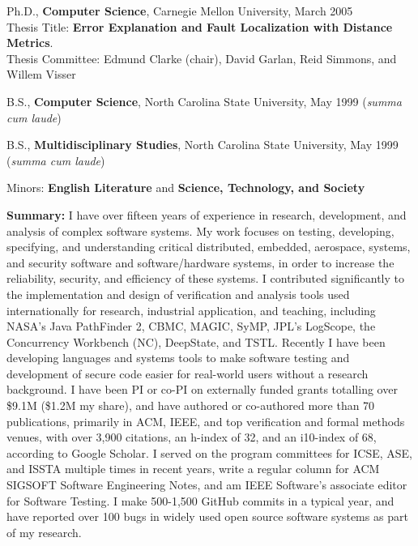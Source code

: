 \documentclass[ComputerScience]{vita}
\begin{document}
\begin{vita}


\begin{Education}
  \item Ph.D., {\bf Computer Science}, Carnegie Mellon University, March 2005\\ Thesis Title:  {\bf Error Explanation and Fault Localization with Distance Metrics}.\\Thesis Committee:  Edmund Clarke (chair), David Garlan, Reid Simmons, and Willem Visser

  \item B.S., {\bf Computer Science}, North Carolina State University, May 1999 (\emph{summa cum laude})
  \item B.S., {\bf Multidisciplinary Studies}, North Carolina State University, May 1999 (\emph{summa cum laude})
\item  \hspace{0.5in} Minors:  {\bf English Literature} and {\bf Science, Technology, and Society}
\end{Education}

\begin{Experience}
\item {\bf Summary:} I have over fifteen years of experience in
  research, development, and analysis of complex software systems.  My
  work focuses on testing, developing, specifying, and understanding
  critical distributed, embedded, aerospace, systems, and security
  software and software/hardware systems, in order to increase the
  reliability, security, and efficiency of these systems.  I
  contributed significantly to the implementation and design of
  verification and analysis tools used internationally for research,
  industrial application, and teaching, including NASA's Java
  PathFinder 2, CBMC, MAGIC, SyMP, JPL's LogScope, the Concurrency
  Workbench (NC), DeepState, and TSTL.  Recently I have been developing languages
  and systems tools to make software testing and development of secure
  code easier for real-world users without a research background.
  I have been PI or co-PI on externally funded grants totalling over
  \$9.1M (\$1.2M my share), and have authored or co-authored more than
  70 publications, primarily in ACM, IEEE, and top verification and
  formal methods venues, with over 3,900 citations, an h-index of 32,
  and an i10-index of 68, according to Google Scholar.  I served on
  the program committees for ICSE, ASE, and ISSTA multiple times in
  recent years, write a regular column for ACM SIGSOFT Software
  Engineering Notes, and am IEEE Software's associate editor for
  Software Testing.  I make 500-1,500 GitHub commits in a typical
  year, and have reported over 100 bugs in widely used open source
  software systems as part of my research.


\end{Experience}
\end{vita}
\end{document}
